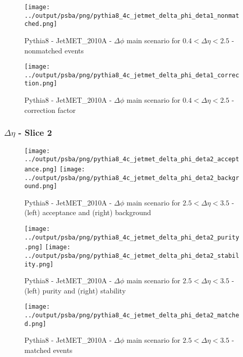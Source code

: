 \documentclass[11pt]{book}
\begin{document}
\begin{figure}[ht]
\centering
\texttt{[image: ../output/psba/png/pythia8\_4c\_jetmet\_delta\_phi\_deta1\_nonmatched.png]}
\caption{Pythia8 - JetMET\_2010A - $\Delta\phi$ main scenario for $0.4 < \Delta\eta < 2.5$ - nonmatched events}
\label{fig:p8_jetmet_delta_phi_deta1_nonmatched}
\end{figure}

\begin{figure}[ht]
\centering
\texttt{[image: ../output/psba/png/pythia8\_4c\_jetmet\_delta\_phi\_deta1\_correction.png]}
\caption{Pythia8 - JetMET\_2010A - $\Delta\phi$ main scenario for $0.4 < \Delta\eta < 2.5$ - correction factor}
\label{fig:p8_jetmet_delta_phi_deta1_correction}
\end{figure}


\clearpage
\subsubsection{$\Delta\eta$ - Slice 2}

\begin{figure}[ht]
\centering
\texttt{[image: ../output/psba/png/pythia8\_4c\_jetmet\_delta\_phi\_deta2\_acceptance.png]}
\texttt{[image: ../output/psba/png/pythia8\_4c\_jetmet\_delta\_phi\_deta2\_background.png]}
\caption{Pythia8 - JetMET\_2010A - $\Delta\phi$ main scenario for $2.5 < \Delta\eta < 3.5$ - (left) acceptance and (right) background}
\label{fig:p8_jetmet_delta_phi_deta2_ab}
\end{figure}

\begin{figure}[ht]
\centering
\texttt{[image: ../output/psba/png/pythia8\_4c\_jetmet\_delta\_phi\_deta2\_purity.png]}
\texttt{[image: ../output/psba/png/pythia8\_4c\_jetmet\_delta\_phi\_deta2\_stability.png]}
\caption{Pythia8 - JetMET\_2010A - $\Delta\phi$ main scenario for $2.5 < \Delta\eta < 3.5$ - (left) purity and (right) stability}
\label{fig:p8_jetmet_delta_phi_deta2_ps}
\end{figure}

\begin{figure}[ht]
\centering
\texttt{[image: ../output/psba/png/pythia8\_4c\_jetmet\_delta\_phi\_deta2\_matched.png]}
\caption{Pythia8 - JetMET\_2010A - $\Delta\phi$ main scenario for $2.5 < \Delta\eta < 3.5$ - matched events}
\label{fig:p8_jetmet_delta_phi_deta2_matched}
\end{figure}
\end{document}
